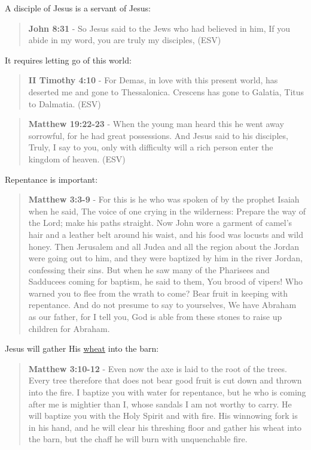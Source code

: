 \documentclass[11pt]{article}
\begin{document}
A disciple of Jesus is a servant of Jesus:

\begin{quote}
\textbf{John 8:31} - So Jesus said to the Jews who had believed in him, If you abide in my word, you are truly my disciples, (ESV)
\end{quote}

It requires letting go of this world:

\begin{quote}
\textbf{II Timothy 4:10} - For Demas, in love with this present world, has deserted me and gone to Thessalonica. Crescens has gone to Galatia, Titus to Dalmatia. (ESV)
\end{quote}

\begin{quote}
\textbf{Matthew 19:22-23} - When the young man heard this he went away sorrowful, for he had great possessions. And Jesus said to his disciples, Truly, I say to you, only with difficulty will a rich person enter the kingdom of heaven. (ESV)
\end{quote}

Repentance is important:

\begin{quote}
\textbf{Matthew 3:3-9} - For this is he who was spoken of by the prophet Isaiah when he said, The voice of one crying in the wilderness: Prepare the way of the Lord; make his paths straight. Now John wore a garment of camel's hair and a leather belt around his waist, and his food was locusts and wild honey. Then Jerusalem and all Judea and all the region about the Jordan were going out to him, and they were baptized by him in the river Jordan, confessing their sins. But when he saw many of the Pharisees and Sadducees coming for baptism, he said to them, You brood of vipers! Who warned you to flee from the wrath to come? Bear fruit in keeping with repentance. And do not presume to say to yourselves, We have Abraham as our father, for I tell you, God is able from these stones to raise up children for Abraham.
\end{quote}

Jesus will gather His \uline{wheat} into the barn:

\begin{quote}
\textbf{Matthew 3:10-12} - Even now the axe is laid to the root of the trees. Every tree therefore that does not bear good fruit is cut down and thrown into the fire. I baptize you with water for repentance, but he who is coming after me is mightier than I, whose sandals I am not worthy to carry. He will baptize you with the Holy Spirit and with fire. His winnowing fork is in his hand, and he will clear his threshing floor and gather his wheat into the barn, but the chaff he will burn with unquenchable fire.
\end{quote}
\end{document}
